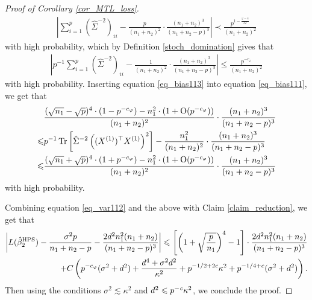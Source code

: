 \begin{proof}[Proof of Corollary \ref{cor_MTL_loss}]
\begin{align*}
\left| \sum_{i=1}^p \left(\hat\Sigma^{-2}\right)_{ii} - \frac{p}{(n_1+n_2)^2}\cdot  \frac{(n_1+n_2)^3}{(n_1+n_2-p)^3}\right|\prec \frac{p^{1-\frac{\varphi-4}{2\varphi}}}{(n_1+n_2)^2}
\end{align*}
with high probability, which by Definition \ref{stoch_domination} gives that
\begin{align}\label{eq_bias113}
\left| p^{-1}\sum_{i=1}^p \left(\hat\Sigma^{-2}\right)_{ii} - \frac{1}{(n_1+n_2)^2}\cdot  \frac{(n_1+n_2)^3}{(n_1+n_2-p)^3}\right|\le \frac{p^{-c_\varphi}}{(n_1+n_2)^2}
\end{align}
with high probability. Inserting equation \eqref{eq_bias113} into equation \eqref{eq_bias111}, we get that
\begin{align*}
		& \frac{(\sqrt{n_1}-\sqrt{p})^4 \cdot (1- p^{-c_\varphi}) - n_1^2 \cdot (1+\operatorname{O}(p^{-c_\varphi}))}{(n_1+n_2)^2}\cdot   \frac{(n_1+n_2)^3}{(n_1+n_2-p)^3}\nonumber \\
		\leqslant &  {p}^{-1}\operatorname{Tr}\left[\hat\Sigma^{-2} \left((X^{(1)})^\top X^{(1)} \right)^2\right] - \frac{n_1^2}{(n_1+n_2)^2}\cdot  \frac{(n_1+n_2)^3}{(n_1+n_2-p)^3} \nonumber\\
		\leqslant &  \frac{(\sqrt{n_1}+\sqrt{p})^4 \cdot (1+ p^{-c_\varphi}) - n_1^2 \cdot (1+\operatorname{O}(p^{-c_\varphi}))}{(n_1+n_2)^2}\cdot   \frac{(n_1+n_2)^3}{(n_1+n_2-p)^3}
\end{align*}
with high probability. 

Combining equation \eqref{eq_var112} and the above with Claim \ref{claim_reduction}, we get that
\begin{align*}
	\left|L(\hat{\beta}_2^{\textup{HPS}})  - \frac{\sigma^2 p}{n_1+n_2-p} -  \frac{2d^2 n_1^2 (n_1+n_2)}{(n_1 + n_2 - p)^3}\right| \leqslant   \left[\left( 1+\sqrt{\frac{p}{n_1}}\right)^4-1\right] \cdot \frac{2d^2n_1^2 (n_1+n_2)}{(n_1 + n_2 - p)^3} \nonumber\\
+C\left( p^{-c_\varphi} (\sigma^2 + d^2)+ \frac{d^4 + \sigma^2 d^2}{\kappa^2}+p^{-1/2+2c}\kappa^2 +  p^{-1/4+c} (\sigma^2 +d^2) \right).
\end{align*}
Then using the conditions $\sigma^2 \lesssim  \kappa^2$ and $d^2 \leqslant p^{-{\mathit{c}}}{\kappa^2}$, we conclude the proof.
\end{proof}
